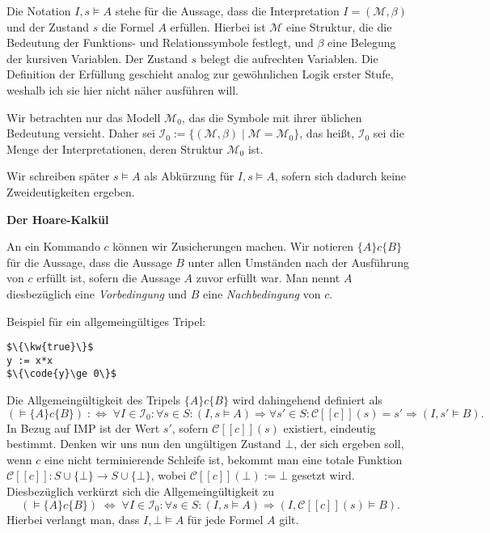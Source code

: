 \documentclass[8pt,fleqn,aspectratio=169]{beamer}
\newcommand{\strong}[1]{\textsf{\textbf{#1}}}
\newcommand{\centerheadline}[1]{%
  \begin{center}\strong{#1}\end{center}}
\newcommand{\parspace}{\vspace{0.8em}}
\newcommand{\kw}[1]{\textbf{\texttt{#1}}}
\newcommand{\code}[1]{{\texttt{#1}}}
\newcommand{\qb}[1]{[\!\![#1]\!\!]}
\newcommand{\evC}{\mathcal C}
\begin{document}
\begin{frame}
Die Notation $I,s\models A$ stehe für die Aussage, dass
die Interpretation $I=(\mathcal M,\beta)$ und der Zustand $s$
die Formel $A$ erfüllen. Hierbei ist $\mathcal M$ eine Struktur, die
die Bedeutung der Funktions- und Relationssymbole festlegt,
und $\beta$ eine Belegung der kursiven Variablen. Der Zustand $s$
belegt die aufrechten Variablen. {\footnotesize Die Definition der
Erfüllung geschieht analog zur gewöhnlichen Logik erster Stufe, weshalb
ich sie hier nicht näher ausführen will.}\pause

\parspace
Wir betrachten nur das Modell $\mathcal M_0$, das die Symbole mit ihrer üblichen
Bedeutung versieht. Daher sei $\mathcal I_0:=\{(\mathcal M,\beta)\mid\mathcal M=\mathcal M_0\}$,
das heißt, $\mathcal I_0$ sei die Menge der Interpretationen, deren Struktur
$\mathcal M_0$ ist.\pause

\parspace
Wir schreiben später $s\models A$ als Abkürzung für $I,s\models A$,
sofern sich dadurch keine Zweideutigkeiten ergeben.
\end{frame}

\begin{frame}
\centerheadline{Der Hoare-Kalkül}
\end{frame}

\begin{frame}[fragile]
An ein Kommando $c$ können wir Zusicherungen machen. Wir notieren
$\{A\}c\{B\}$ für die Aussage, dass die Aussage $B$ unter allen Umständen
nach der Ausführung von $c$ erfüllt ist, sofern die Aussage $A$ zuvor
erfüllt war. Man nennt $A$ diesbezüglich eine \emph{Vorbedingung}
und $B$ eine \emph{Nachbedingung} von $c$.\pause

\parspace
Beispiel für ein allgemeingültiges Tripel:
\begin{lstlisting}[language=IMP, xleftmargin=\mathindent, mathescape]
$\{\kw{true}\}$
y := x*x
$\{\code{y}\ge 0\}$
\end{lstlisting}
\end{frame}

\begin{frame}
Die Allgemeingültigkeit des Tripels $\{A\}c\{B\}$ wird dahingehend
definiert als
\[(\models\{A\}c \{B\}) \;:\Leftrightarrow\; \forall I\in\mathcal I_0\colon\forall s\in S\colon
(I,s\models A)\Rightarrow\forall s'\in S\colon \evC\qb{c}(s)=s'\Rightarrow (I,s'\models B).\]\pause
{\footnotesize In Bezug auf IMP ist der Wert $s'$,
sofern $\evC\qb{c}(s)$ existiert, eindeutig bestimmt.
Denken wir uns nun den ungültigen Zustand $\bot$, der sich ergeben soll,
wenn $c$ eine nicht terminierende Schleife ist, bekommt man eine totale Funktion
$\evC\qb{c}\colon S\cup\{\bot\}\to S\cup\{\bot\}$, wobei $\evC\qb{c}(\bot):=\bot$
gesetzt wird. Diesbezüglich verkürzt sich die Allgemeingültigkeit zu
\[(\models\{A\}c \{B\}) \;\Leftrightarrow\; \forall I\in\mathcal I_0\colon\forall s\in S\colon
(I,s\models A)\Rightarrow (I,\evC\qb{c}(s)\models B).\]
Hierbei verlangt man, dass $I,\bot\models A$ für jede Formel $A$ gilt.}
\end{frame}
\end{document}
